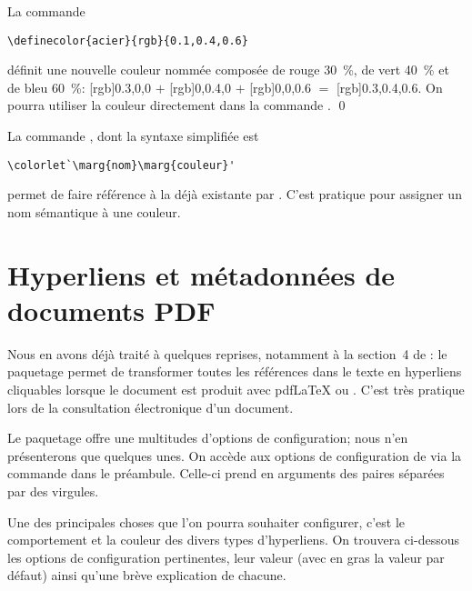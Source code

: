 \begin{exemple}
  La commande
\begin{lstlisting}
\definecolor{acier}{rgb}{0.1,0.4,0.6}
\end{lstlisting}
  définit une nouvelle couleur nommée  composée de rouge
  30~\%, de vert 40~\% et de bleu 60~\%: %
  [rgb]{0.3,0,0}{\phantom{xx}} $+$ %
  [rgb]{0,0.4,0}{\phantom{xx}} $+$ %
  [rgb]{0,0,0.6}{\phantom{xx}} $=$ %
  [rgb]{0.3,0.4,0.6}{\phantom{xx}}. %
  On pourra utiliser la couleur  directement dans la
  commande \cmdprint{\color}. %
  \qed
\end{exemple}

La commande , dont la syntaxe simplifiée est
\begin{lstlisting}
\colorlet`\marg{nom}\marg{couleur}'
\end{lstlisting}
permet de faire référence à la  déjà existante par
. C'est pratique pour assigner un nom sémantique à une
couleur.



\section{Hyperliens et métadonnées de documents PDF}
\label{sec:trucs:hyperliens}

Nous en avons déjà traité à quelques reprises, notamment à la
section~4 de \citet{UL:latex:1}: le paquetage 
\citep{hyperref} permet de transformer toutes les références dans le
texte en hyperliens cliquables lorsque le document est produit avec
pdf{\LaTeX} ou {\XeLaTeX}. C'est très pratique lors de la consultation
électronique d'un document.

Le paquetage offre une multitudes d'options de configuration; nous
n'en présenterons que quelques unes. On accède aux options de
configuration de  via la commande \cmd{\hypersetup} dans
le préambule. Celle-ci prend en arguments des paires
 séparées par des virgules.

Une des principales choses que l'on pourra souhaiter configurer, c'est
le comportement et la couleur des divers types d'hyperliens. On
trouvera ci-dessous les options de configuration pertinentes, leur
valeur (avec en gras la valeur par défaut) ainsi qu'une brève
explication de chacune.

